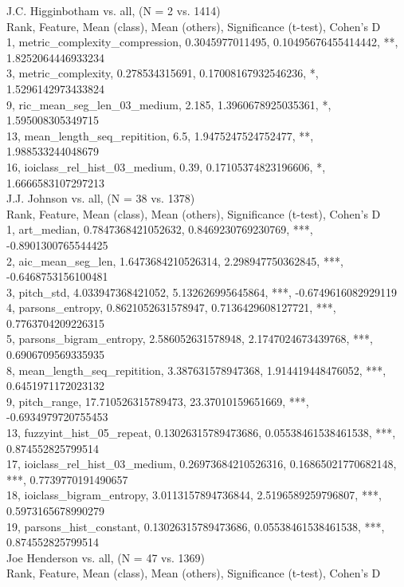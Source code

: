 J.C. Higginbotham vs. all, (N = 2 vs. 1414)\\
Rank, Feature, Mean (class), Mean (others), Significance (t-test), Cohen's D\\
1, metric_complexity_compression, 0.3045977011495, 0.10495676455414442, **, 1.8252064446933234\\
3, metric_complexity, 0.278534315691, 0.17008167932546236, *, 1.5296142973433824\\
9, ric_mean_seg_len_03_medium, 2.185, 1.3960678925035361, *, 1.595008305349715\\
13, mean_length_seq_repitition, 6.5, 1.9475247524752477, **, 1.988533244048679\\
16, ioiclass_rel_hist_03_medium, 0.39, 0.17105374823196606, *, 1.6666583107297213\\
J.J. Johnson vs. all, (N = 38 vs. 1378)\\
Rank, Feature, Mean (class), Mean (others), Significance (t-test), Cohen's D\\
1, art_median, 0.7847368421052632, 0.8469230769230769, ***, -0.8901300765544425\\
2, aic_mean_seg_len, 1.6473684210526314, 2.298947750362845, ***, -0.6468753156100481\\
3, pitch_std, 4.033947368421052, 5.132626995645864, ***, -0.6749616082929119\\
4, parsons_entropy, 0.8621052631578947, 0.7136429608127721, ***, 0.7763704209226315\\
5, parsons_bigram_entropy, 2.586052631578948, 2.1747024673439768, ***, 0.6906709569335935\\
8, mean_length_seq_repitition, 3.387631578947368, 1.914419448476052, ***, 0.6451971172023132\\
9, pitch_range, 17.710526315789473, 23.37010159651669, ***, -0.6934979720755453\\
13, fuzzyint_hist_05_repeat, 0.13026315789473686, 0.05538461538461538, ***, 0.874552825799514\\
17, ioiclass_rel_hist_03_medium, 0.26973684210526316, 0.16865021770682148, ***, 0.7739770191490657\\
18, ioiclass_bigram_entropy, 3.0113157894736844, 2.5196589259796807, ***, 0.5973165678990279\\
19, parsons_hist_constant, 0.13026315789473686, 0.05538461538461538, ***, 0.874552825799514\\
Joe Henderson vs. all, (N = 47 vs. 1369)\\
Rank, Feature, Mean (class), Mean (others), Significance (t-test), Cohen's D\\
